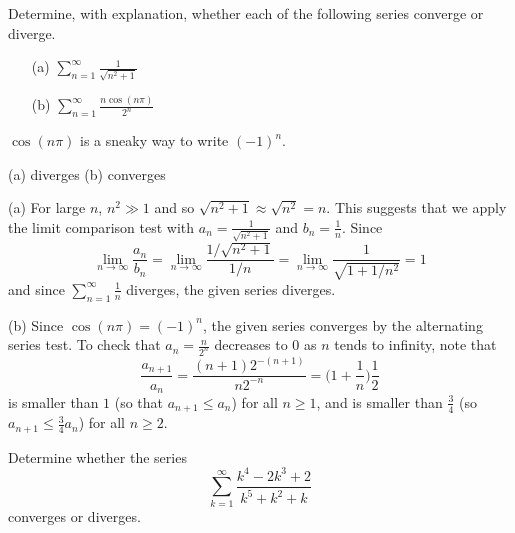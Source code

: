 \begin{question}[2014A]
Determine, with explanation, whether each of the following series converge or diverge.

\begin{enumerate}
\item[(a)] $\displaystyle\sum_{n=1}^\infty\frac{1}{\sqrt{n^2+1}}$
\item[(b)] $\displaystyle\sum_{n=1}^\infty\frac{n\cos(n\pi)}{2^n}$
\end{enumerate}
\end{question}

\begin{hint}
$\cos(n\pi)$ is a sneaky way to write $(-1)^n$.
\end{hint}

\begin{answer}
(a) diverges
\qquad (b) converges
\end{answer}

\begin{solution}
(a) For large $n$, $n^2\gg 1$ and so
$\sqrt{n^2+1}\approx \sqrt{n^2}= n$. This suggests that we apply the limit
comparison test with $a_n=\frac{1}{\sqrt{n^2+1}}$ and $b_n=\frac{1}{n}$.
Since
\begin{equation*}
\lim_{n\rightarrow\infty} \frac{a_n}{b_n}
=\lim_{n\rightarrow\infty} \frac{1/\sqrt{n^2+1}}{1/n}
=\lim_{n\rightarrow\infty} \frac{1}{\sqrt{1+1/n^2}}
=1
\end{equation*}
and since $\sum\limits_{n=1}^\infty\frac{1}{n}$ diverges, the given
series diverges.

\noindent (b) Since $\cos(n\pi)=(-1)^n$, the given series
converges by the alternating series test.
To check that $a_n=\frac{n}{2^n}$ decreases to $0$ as $n$ tends
to infinity, note that
\begin{equation*}
\frac{a_{n+1}}{a_n} =\frac{(n+1)2^{-(n+1)}}{n2^{-n}}
=\Big(1+\frac{1}{n}\Big)\frac{1}{2}
\end{equation*}
is smaller than $1$ (so that $a_{n+1}\le a_n$) for all $n\ge 1$,
and is smaller than $\frac{3}{4}$ (so $a_{n+1}\le \frac{3}{4}a_n$)
for all $n\ge 2$.
\end{solution}

\begin{question}[M105 2012A]
Determine whether the series
\begin{equation*}
\sum_{k=1}^\infty\frac{k^4-2k^3+2}{k^5+k^2+k}
\end{equation*}
converges or diverges.
\end{question}

